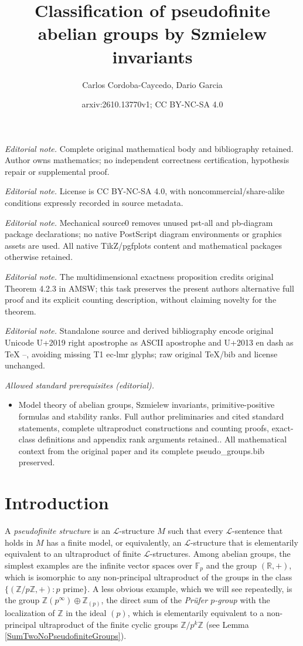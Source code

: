 \documentclass[10pt,a4paper]{amsart}
\title{Classification of pseudofinite abelian groups by Szmielew invariants}
\author{Carlos Cordoba-Caycedo, Dario Garcia}
\date{arxiv:2610.13770v1; CC BY-NC-SA 4.0}
\theoremstyle{definition}
\newcommand{\Le}{\mathcal{L}}
\begin{document}
\maketitle
\noindent\textit{Editorial note.} Complete original mathematical body and bibliography retained. Author owns mathematics; no independent correctness certification, hypothesis repair or supplemental proof.\par\medskip
\noindent\textit{Editorial note.} License is CC BY-NC-SA 4.0, with noncommercial/share-alike conditions expressly recorded in source metadata.\par\medskip
\noindent\textit{Editorial note.} Mechanical source0 removes unused pst-all and pb-diagram package declarations; no native PostScript diagram environments or graphics assets are used. All native TikZ/pgfplots content and mathematical packages otherwise retained.\par\medskip
\noindent\textit{Editorial note.} The multidimensional exactness proposition credits original Theorem 4.2.3 in AMSW; this task preserves the present authors alternative full proof and its explicit counting description, without claiming novelty for the theorem.\par\medskip
\noindent\textit{Editorial note.} Standalone source and derived bibliography encode original Unicode U+2019 right apostrophe as ASCII apostrophe and U+2013 en dash as TeX --, avoiding missing T1 ec-lmr glyphs; raw original TeX/bib and license unchanged.\par\medskip
\noindent\textit{Allowed standard prerequisites (editorial).}\begin{itemize}
\item Model theory of abelian groups, Szmielew invariants, primitive-positive formulas and stability ranks. Full author preliminaries and cited standard statements, complete ultraproduct constructions and counting proofs, exact-class definitions and appendix rank arguments retained.. All mathematical context from the original paper and its complete pseudo\_groups.bib preserved.
\end{itemize}\medskip
\section{Introduction}

A \emph{pseudofinite structure} is an $\Le$-structure $M$ such that every
$\Le$-sentence that holds in $M$ has a finite model, or equivalently, an
$\Le$-structure that is elementarily equivalent to an ultraproduct of finite
$\Le$-structures. Among abelian groups, the simplest examples are the infinite vector
spaces over $\mathbb{F}_p$ and the group $(\mathbb{R},+)$, which is
isomorphic to any non-principal ultraproduct of the groups in the class
$\{(\mathbb{Z}/p\mathbb{Z},+) : p \text{ prime}\}$. A less obvious example,
which we will see repeatedly, is the group
$\mathbb{Z}(p^\infty)\oplus\mathbb{Z}_{(p)}$, the direct sum of the \emph{Prüfer $p$-group} with the localization of $\mathbb{Z}$ in the ideal $(p)$, which is elementarily
equivalent to a non-principal ultraproduct of the finite cyclic groups
$\mathbb{Z}/p^k\mathbb{Z}$ (see Lemma \ref{SumTwoNoPseudofiniteGroups}).\\
\end{document}
